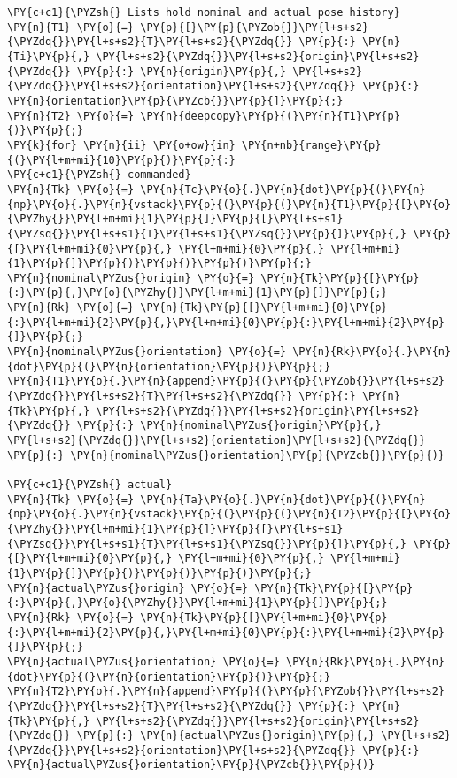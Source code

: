 \documentclass[a4paper]{scrreprt}
\begin{document}
\begin{Verbatim}[commandchars=\\\{\}]
\PY{c+c1}{\PYZsh{} Lists hold nominal and actual pose history}
\PY{n}{T1} \PY{o}{=} \PY{p}{[}\PY{p}{\PYZob{}}\PY{l+s+s2}{\PYZdq{}}\PY{l+s+s2}{T}\PY{l+s+s2}{\PYZdq{}} \PY{p}{:} \PY{n}{Ti}\PY{p}{,} \PY{l+s+s2}{\PYZdq{}}\PY{l+s+s2}{origin}\PY{l+s+s2}{\PYZdq{}} \PY{p}{:} \PY{n}{origin}\PY{p}{,} \PY{l+s+s2}{\PYZdq{}}\PY{l+s+s2}{orientation}\PY{l+s+s2}{\PYZdq{}} \PY{p}{:} \PY{n}{orientation}\PY{p}{\PYZcb{}}\PY{p}{]}\PY{p}{;} 
\PY{n}{T2} \PY{o}{=} \PY{n}{deepcopy}\PY{p}{(}\PY{n}{T1}\PY{p}{)}\PY{p}{;} 
\PY{k}{for} \PY{n}{ii} \PY{o+ow}{in} \PY{n+nb}{range}\PY{p}{(}\PY{l+m+mi}{10}\PY{p}{)}\PY{p}{:}
\PY{c+c1}{\PYZsh{} commanded}
\PY{n}{Tk} \PY{o}{=} \PY{n}{Tc}\PY{o}{.}\PY{n}{dot}\PY{p}{(}\PY{n}{np}\PY{o}{.}\PY{n}{vstack}\PY{p}{(}\PY{p}{(}\PY{n}{T1}\PY{p}{[}\PY{o}{\PYZhy{}}\PY{l+m+mi}{1}\PY{p}{]}\PY{p}{[}\PY{l+s+s1}{\PYZsq{}}\PY{l+s+s1}{T}\PY{l+s+s1}{\PYZsq{}}\PY{p}{]}\PY{p}{,} \PY{p}{[}\PY{l+m+mi}{0}\PY{p}{,} \PY{l+m+mi}{0}\PY{p}{,} \PY{l+m+mi}{1}\PY{p}{]}\PY{p}{)}\PY{p}{)}\PY{p}{)}\PY{p}{;} 
\PY{n}{nominal\PYZus{}origin} \PY{o}{=} \PY{n}{Tk}\PY{p}{[}\PY{p}{:}\PY{p}{,}\PY{o}{\PYZhy{}}\PY{l+m+mi}{1}\PY{p}{]}\PY{p}{;} 
\PY{n}{Rk} \PY{o}{=} \PY{n}{Tk}\PY{p}{[}\PY{l+m+mi}{0}\PY{p}{:}\PY{l+m+mi}{2}\PY{p}{,}\PY{l+m+mi}{0}\PY{p}{:}\PY{l+m+mi}{2}\PY{p}{]}\PY{p}{;} 
\PY{n}{nominal\PYZus{}orientation} \PY{o}{=} \PY{n}{Rk}\PY{o}{.}\PY{n}{dot}\PY{p}{(}\PY{n}{orientation}\PY{p}{)}\PY{p}{;}    
\PY{n}{T1}\PY{o}{.}\PY{n}{append}\PY{p}{(}\PY{p}{\PYZob{}}\PY{l+s+s2}{\PYZdq{}}\PY{l+s+s2}{T}\PY{l+s+s2}{\PYZdq{}} \PY{p}{:} \PY{n}{Tk}\PY{p}{,} \PY{l+s+s2}{\PYZdq{}}\PY{l+s+s2}{origin}\PY{l+s+s2}{\PYZdq{}} \PY{p}{:} \PY{n}{nominal\PYZus{}origin}\PY{p}{,} \PY{l+s+s2}{\PYZdq{}}\PY{l+s+s2}{orientation}\PY{l+s+s2}{\PYZdq{}} \PY{p}{:} \PY{n}{nominal\PYZus{}orientation}\PY{p}{\PYZcb{}}\PY{p}{)}

\PY{c+c1}{\PYZsh{} actual}
\PY{n}{Tk} \PY{o}{=} \PY{n}{Ta}\PY{o}{.}\PY{n}{dot}\PY{p}{(}\PY{n}{np}\PY{o}{.}\PY{n}{vstack}\PY{p}{(}\PY{p}{(}\PY{n}{T2}\PY{p}{[}\PY{o}{\PYZhy{}}\PY{l+m+mi}{1}\PY{p}{]}\PY{p}{[}\PY{l+s+s1}{\PYZsq{}}\PY{l+s+s1}{T}\PY{l+s+s1}{\PYZsq{}}\PY{p}{]}\PY{p}{,} \PY{p}{[}\PY{l+m+mi}{0}\PY{p}{,} \PY{l+m+mi}{0}\PY{p}{,} \PY{l+m+mi}{1}\PY{p}{]}\PY{p}{)}\PY{p}{)}\PY{p}{)}\PY{p}{;} 
\PY{n}{actual\PYZus{}origin} \PY{o}{=} \PY{n}{Tk}\PY{p}{[}\PY{p}{:}\PY{p}{,}\PY{o}{\PYZhy{}}\PY{l+m+mi}{1}\PY{p}{]}\PY{p}{;} 
\PY{n}{Rk} \PY{o}{=} \PY{n}{Tk}\PY{p}{[}\PY{l+m+mi}{0}\PY{p}{:}\PY{l+m+mi}{2}\PY{p}{,}\PY{l+m+mi}{0}\PY{p}{:}\PY{l+m+mi}{2}\PY{p}{]}\PY{p}{;} 
\PY{n}{actual\PYZus{}orientation} \PY{o}{=} \PY{n}{Rk}\PY{o}{.}\PY{n}{dot}\PY{p}{(}\PY{n}{orientation}\PY{p}{)}\PY{p}{;}  
\PY{n}{T2}\PY{o}{.}\PY{n}{append}\PY{p}{(}\PY{p}{\PYZob{}}\PY{l+s+s2}{\PYZdq{}}\PY{l+s+s2}{T}\PY{l+s+s2}{\PYZdq{}} \PY{p}{:} \PY{n}{Tk}\PY{p}{,} \PY{l+s+s2}{\PYZdq{}}\PY{l+s+s2}{origin}\PY{l+s+s2}{\PYZdq{}} \PY{p}{:} \PY{n}{actual\PYZus{}origin}\PY{p}{,} \PY{l+s+s2}{\PYZdq{}}\PY{l+s+s2}{orientation}\PY{l+s+s2}{\PYZdq{}} \PY{p}{:} \PY{n}{actual\PYZus{}orientation}\PY{p}{\PYZcb{}}\PY{p}{)}


\end{Verbatim}
\end{document}
